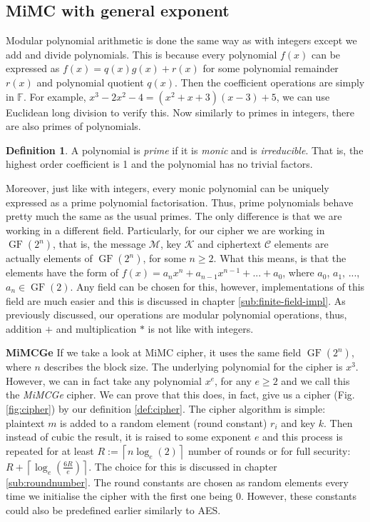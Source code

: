 \documentclass{Resources/UoBLab1}
\theoremstyle{definition}
\newtheorem{definition}[theorem]{Definition}
\begin{document}
\subsection{MiMC with general exponent}\label{sub:mimcge}
Modular polynomial arithmetic is done the same way as with integers except we add and divide polynomials. This is because every polynomial $f(x)$ can be expressed as $f(x) = q(x)g(x) + r(x)$ for some polynomial remainder $r(x)$ and polynomial quotient $q(x)$. Then the coefficient operations are simply in $\mathbb{F}$. For example, \(x^3-2x^2-4 = (x^2+x+3)(x-3) + 5\), we can use Euclidean long division to verify this. Now similarly to primes in integers, there are also primes of polynomials.
\begin{definition}\label{def:prime-poly}
    A polynomial is \textit{prime} if it is \textit{monic} and is \textit{irreducible}. That is, the highest order coefficient is 1 and the polynomial has no trivial factors.
\end{definition}
Moreover, just like with integers, every monic polynomial can be uniquely expressed as a prime polynomial factorisation. Thus, prime polynomials behave pretty much the same as the usual primes. The only difference is that we are working in a different field. Particularly, for our cipher we are working in $\operatorname{GF}(2^n)$, that is, the message $\mathcal{M}$, key $\mathcal{K}$ and ciphertext $\mathcal{C}$ elements are actually elements of $\operatorname{GF}(2^n)$, for some $n \ge 2$. What this means, is that the elements have the form of $f(x) = a_nx^n + a_{n-1}x^{n-1} + ... + a_0$, where $a_0$, $a_1$, ..., $a_n \in \operatorname{GF}(2)$. Any field can be chosen for this, however, implementations of this field are much easier and this is discussed in chapter \ref{sub:finite-field-impl}. As previously discussed, our operations are modular polynomial operations, thus, addition $+$ and multiplication $*$ is not like with integers.\medskip

\noindent\textbf{MiMCGe} If we take a look at MiMC cipher\cite{MiMC}, it uses the same field $\operatorname{GF}(2^n)$, where $n$ describes the block size. The underlying polynomial for the cipher is $x^3$. However, we can in fact take any polynomial $x^e$, for any $e \ge 2$ and we call this the \textit{MiMCGe} cipher. We can prove that this does, in fact, give us a cipher (Fig. \ref{fig:cipher}) by our definition \ref{def:cipher}. The cipher algorithm is simple: plaintext $m$ is added to a random element (round constant) $r_i$ and key $k$. Then instead of cubic the result, it is raised to some exponent $e$ and this process is repeated for at least $R := \left\lceil n\log_e(2) \right\rceil$ number of rounds or for full security: \(R + \left\lceil \log_e(\frac{6R}{e}) \right\rceil\). The choice for this is discussed in chapter \ref{sub:roundnumber}. The round constants are chosen as random elements every time we initialise the cipher with the first one being $0$. However, these constants could also be predefined earlier similarly to AES.
\end{document}
